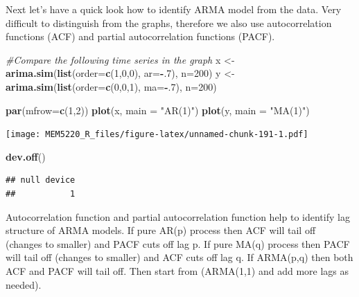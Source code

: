 \documentclass[]{book}
\newenvironment{Shaded}{\begin{snugshade}}{\end{snugshade}}
\newcommand{\CommentTok}[1]{\textcolor[rgb]{0.56,0.35,0.01}{\textit{#1}}}
\newcommand{\DataTypeTok}[1]{\textcolor[rgb]{0.13,0.29,0.53}{#1}}
\newcommand{\DecValTok}[1]{\textcolor[rgb]{0.00,0.00,0.81}{#1}}
\newcommand{\KeywordTok}[1]{\textcolor[rgb]{0.13,0.29,0.53}{\textbf{#1}}}
\newcommand{\NormalTok}[1]{#1}
\newcommand{\OperatorTok}[1]{\textcolor[rgb]{0.81,0.36,0.00}{\textbf{#1}}}
\newcommand{\StringTok}[1]{\textcolor[rgb]{0.31,0.60,0.02}{#1}}
\begin{document}
Next let's have a quick look how to identify ARMA model from the data. Very difficult to distinguish from the graphs, therefore we also use autocorrelation functions (ACF) and partial autocorrelation functions (PACF).

\begin{Shaded}
\begin{Highlighting}[]
\CommentTok{#Compare the following time series in the graph}
\NormalTok{x <-}\StringTok{ }\KeywordTok{arima.sim}\NormalTok{(}\KeywordTok{list}\NormalTok{(}\DataTypeTok{order=}\KeywordTok{c}\NormalTok{(}\DecValTok{1}\NormalTok{,}\DecValTok{0}\NormalTok{,}\DecValTok{0}\NormalTok{), }\DataTypeTok{ar=}\OperatorTok{-}\NormalTok{.}\DecValTok{7}\NormalTok{), }\DataTypeTok{n=}\DecValTok{200}\NormalTok{)}
\NormalTok{y <-}\StringTok{ }\KeywordTok{arima.sim}\NormalTok{(}\KeywordTok{list}\NormalTok{(}\DataTypeTok{order=}\KeywordTok{c}\NormalTok{(}\DecValTok{0}\NormalTok{,}\DecValTok{0}\NormalTok{,}\DecValTok{1}\NormalTok{), }\DataTypeTok{ma=}\OperatorTok{-}\NormalTok{.}\DecValTok{7}\NormalTok{), }\DataTypeTok{n=}\DecValTok{200}\NormalTok{)}

\KeywordTok{par}\NormalTok{(}\DataTypeTok{mfrow=}\KeywordTok{c}\NormalTok{(}\DecValTok{1}\NormalTok{,}\DecValTok{2}\NormalTok{))}
\KeywordTok{plot}\NormalTok{(x, }\DataTypeTok{main =} \StringTok{"AR(1)"}\NormalTok{)}
\KeywordTok{plot}\NormalTok{(y, }\DataTypeTok{main =} \StringTok{"MA(1)"}\NormalTok{)}
\end{Highlighting}
\end{Shaded}

\texttt{[image: MEM5220\_R\_files/figure-latex/unnamed-chunk-191-1.pdf]}

\begin{Shaded}
\begin{Highlighting}[]
\KeywordTok{dev.off}\NormalTok{()}
\end{Highlighting}
\end{Shaded}

\begin{verbatim}
## null device 
##           1
\end{verbatim}

Autocorrelation function and partial autocorrelation function help to identify lag structure of ARMA models.
If pure AR(p) process then ACF will tail off (changes to smaller) and PACF cuts off lag p.
If pure MA(q) process then PACF will tail off (changes to smaller) and ACF cuts off lag q.
If ARMA(p,q) then both ACF and PACF will tail off. Then start from (ARMA(1,1) and add more lags as needed).
\end{document}
